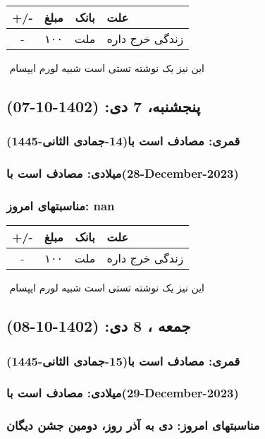 \documentclass{article}
\newcommand{\rnote}[1]{\marginpar{\textcolor{color}{\StrSubstitute{\##1}{ }{\_}}}}
\newcommand{\myRow}[4]{
    #1 & #2 & #3 & #4 \\ \hline
}
\begin{document}
\begin{tabular}{ | c | c | c | p{5cm} |}
    \hline
    \myRow{ +/- }{مبلغ}{بانک}{علت}
    \myRow{-}{۱۰۰}{ملت}{زندگی خرج داره}
\end{tabular}
\newline
\newline

‌
\rnote{تست}
این نیز یک نوشته تستی است شبیه لورم ایپسام




\newpage
{}
\textcolor{color}{
\section{ پنجشنبه، 7 دی: (1402-10-07) }
\subsubsection*{قمری: مصادف است با(14-جمادی الثانی-1445)} 
\subsubsection*{میلادی: مصادف است با(28-December-2023)}
\subsubsection*{مناسبتهای امروز: nan}
}


\begin{tabular}{ | c | c | c | p{5cm} |}
    \hline
    \myRow{ +/- }{مبلغ}{بانک}{علت}
    \myRow{-}{۱۰۰}{ملت}{زندگی خرج داره}
\end{tabular}
\newline
\newline

‌
\rnote{تست}
این نیز یک نوشته تستی است شبیه لورم ایپسام




\newpage
{}
\textcolor{color}{
\section{ جمعه ، 8 دی: (1402-10-08) }
\subsubsection*{قمری: مصادف است با(15-جمادی الثانی-1445)} 
\subsubsection*{میلادی: مصادف است با(29-December-2023)}
\subsubsection*{مناسبتهای امروز: دی به آذر روز، دومین جشن دیگان}
}
\end{document}
